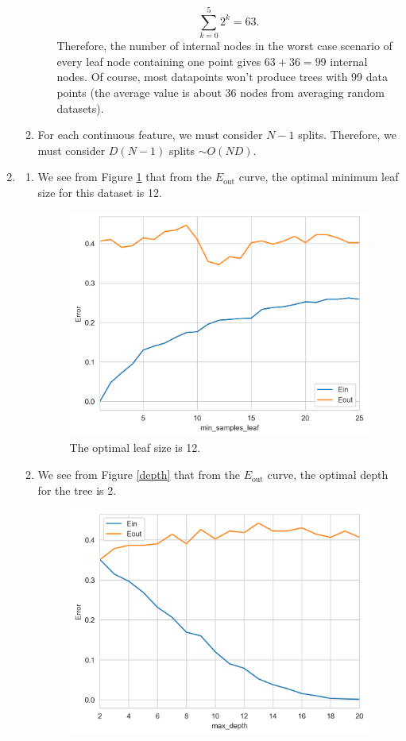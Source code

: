 \documentclass[12pt]{article}
\newcommand{\Eout}{E_{\text{out}}}
\begin{document}
\begin{enumerate}[leftmargin=*]
\begin{enumerate}[label=\Alph*.]
\begin{enumerate}
\[ \sum_{k = 0}^5 2^k = 63. \]
Therefore, the number of internal nodes in the worst case scenario of every leaf node containing one point gives $63 + 36 = 99$ internal nodes. Of course, most datapoints won't produce trees with 99 data points (the average value is about 36 nodes from averaging random datasets).
\end{enumerate}
\item For each continuous feature, we must consider $N - 1$ splits. Therefore, we must consider $D (N - 1)$ splits $\sim O(ND)$.
\end{enumerate}
\item
\begin{enumerate}[label=\Alph*.]
\item We see from Figure \ref{leaf} that from the $\Eout$ curve, the optimal minimum leaf size for this dataset is 12.
\begin{figure}[h!]
\centering
\includegraphics[scale = 0.5]{Set3Figures/minleafsize.png}
\caption{The optimal leaf size is 12.} \label{leaf}
\end{figure}
\item We see from Figure \ref{depth} that from the $\Eout$ curve, the optimal depth for the tree is 2.
\begin{figure}[h!]
\centering
\includegraphics[scale=0.5]{Set3Figures/maxdepth.png}

\end{figure}
\end{enumerate}
\end{enumerate}
\end{document}
